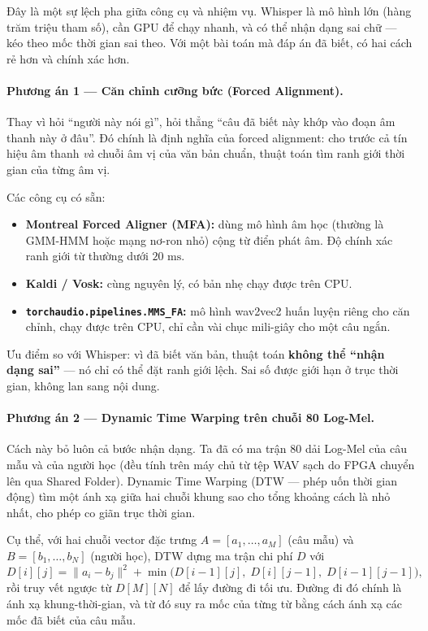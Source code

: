 \documentclass[11pt,a4paper]{article}
\begin{document}
Đây là một sự lệch pha giữa công cụ và nhiệm vụ. Whisper là mô hình lớn (hàng trăm triệu tham số), cần GPU để chạy nhanh, và có thể nhận dạng sai chữ --- kéo theo mốc thời gian sai theo. Với một bài toán mà đáp án đã biết, có hai cách rẻ hơn và chính xác hơn.

\paragraph{Phương án 1 --- Căn chỉnh cưỡng bức (Forced Alignment).}
Thay vì hỏi ``người này nói gì'', hỏi thẳng ``câu đã biết này khớp vào đoạn âm thanh này ở đâu''. Đó chính là định nghĩa của forced alignment: cho trước cả tín hiệu âm thanh \emph{và} chuỗi âm vị của văn bản chuẩn, thuật toán tìm ranh giới thời gian của từng âm vị.

Các công cụ có sẵn:
\begin{itemize}
    \setlength{\itemsep}{1pt}
    \item \textbf{Montreal Forced Aligner (MFA):} dùng mô hình âm học (thường là GMM-HMM hoặc mạng nơ-ron nhỏ) cộng từ điển phát âm. Độ chính xác ranh giới từ thường dưới $20\text{ ms}$.
    \item \textbf{Kaldi / Vosk:} cùng nguyên lý, có bản nhẹ chạy được trên CPU.
    \item \textbf{\texttt{torchaudio.pipelines.MMS\_FA}:} mô hình wav2vec2 huấn luyện riêng cho căn chỉnh, chạy được trên CPU, chỉ cần vài chục mili-giây cho một câu ngắn.
\end{itemize}

Ưu điểm so với Whisper: vì đã biết văn bản, thuật toán \textbf{không thể ``nhận dạng sai''} --- nó chỉ có thể đặt ranh giới lệch. Sai số được giới hạn ở trục thời gian, không lan sang nội dung.

\paragraph{Phương án 2 --- Dynamic Time Warping trên chuỗi 80 Log-Mel.}
Cách này bỏ luôn cả bước nhận dạng. Ta đã có ma trận 80 dải Log-Mel của câu mẫu và của người học (đều tính trên máy chủ từ tệp WAV sạch do FPGA chuyển lên qua Shared Folder). Dynamic Time Warping (DTW --- phép uốn thời gian động) tìm một ánh xạ giữa hai chuỗi khung sao cho tổng khoảng cách là nhỏ nhất, cho phép co giãn trục thời gian.

Cụ thể, với hai chuỗi vector đặc trưng $A = [a_1, \dots, a_M]$ (câu mẫu) và $B = [b_1, \dots, b_N]$ (người học), DTW dựng ma trận chi phí $D$ với
\[
D[i][j] = \lVert a_i - b_j \rVert^2 + \min\bigl(D[i-1][j],\; D[i][j-1],\; D[i-1][j-1]\bigr),
\]
rồi truy vết ngược từ $D[M][N]$ để lấy đường đi tối ưu. Đường đi đó chính là ánh xạ khung-thời-gian, và từ đó suy ra mốc của từng từ bằng cách ánh xạ các mốc đã biết của câu mẫu.
\end{document}
